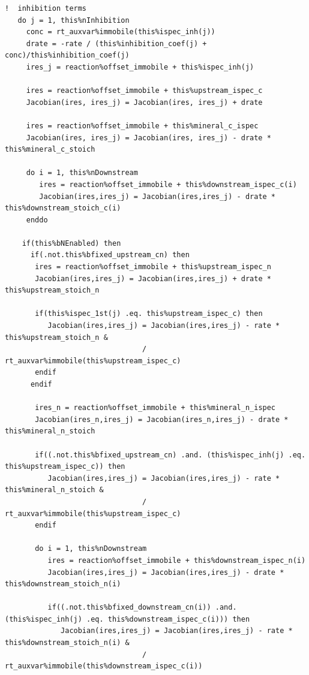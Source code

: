 \documentclass[12pt, a4paper]{article}
\begin{document}
\begin{verbatim}
!  inhibition terms
   do j = 1, this%nInhibition
     conc = rt_auxvar%immobile(this%ispec_inh(j))  
     drate = -rate / (this%inhibition_coef(j) + conc)/this%inhibition_coef(j) 
     ires_j = reaction%offset_immobile + this%ispec_inh(j) 

     ires = reaction%offset_immobile + this%upstream_ispec_c      
     Jacobian(ires, ires_j) = Jacobian(ires, ires_j) + drate       

     ires = reaction%offset_immobile + this%mineral_c_ispec      
     Jacobian(ires, ires_j) = Jacobian(ires, ires_j) - drate * this%mineral_c_stoich      

     do i = 1, this%nDownstream
        ires = reaction%offset_immobile + this%downstream_ispec_c(i)      
        Jacobian(ires,ires_j) = Jacobian(ires,ires_j) - drate * this%downstream_stoich_c(i)
     enddo 

    if(this%bNEnabled) then
      if(.not.this%bfixed_upstream_cn) then
       ires = reaction%offset_immobile + this%upstream_ispec_n      
       Jacobian(ires,ires_j) = Jacobian(ires,ires_j) + drate * this%upstream_stoich_n      
       
       if(this%ispec_1st(j) .eq. this%upstream_ispec_c) then
          Jacobian(ires,ires_j) = Jacobian(ires,ires_j) - rate * this%upstream_stoich_n &      
                                / rt_auxvar%immobile(this%upstream_ispec_c)
       endif
      endif
 
       ires_n = reaction%offset_immobile + this%mineral_n_ispec      
       Jacobian(ires_n,ires_j) = Jacobian(ires_n,ires_j) - drate * this%mineral_n_stoich      

       if((.not.this%bfixed_upstream_cn) .and. (this%ispec_inh(j) .eq. this%upstream_ispec_c)) then
          Jacobian(ires,ires_j) = Jacobian(ires,ires_j) - rate * this%mineral_n_stoich &      
                                / rt_auxvar%immobile(this%upstream_ispec_c)
       endif
       
       do i = 1, this%nDownstream
          ires = reaction%offset_immobile + this%downstream_ispec_n(i)      
          Jacobian(ires,ires_j) = Jacobian(ires,ires_j) - drate * this%downstream_stoich_n(i)      

          if((.not.this%bfixed_downstream_cn(i)) .and. (this%ispec_inh(j) .eq. this%downstream_ispec_c(i))) then
             Jacobian(ires,ires_j) = Jacobian(ires,ires_j) - rate * this%downstream_stoich_n(i) &      
                                / rt_auxvar%immobile(this%downstream_ispec_c(i))


\end{verbatim}
\end{document}
